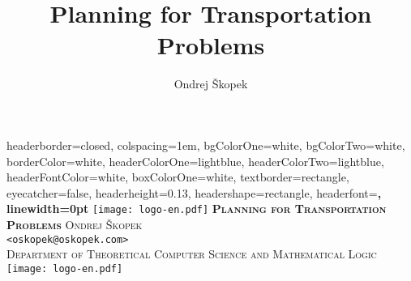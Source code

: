 \documentclass[a0paper,fontscale=0.285]{baposter} %
\title{\huge Planning for Transportation Problems} %
\author{Ondrej \v{S}kopek} %
\newcommand{\insertdepartment}{Department of Theoretical Computer Science and Mathematical Logic}
\begin{document}
\begin{poster}
{
headerborder=closed, %
colspacing=1em, %
bgColorOne=white, %
bgColorTwo=white, %
borderColor=white, %
headerColorOne=lightblue, %
headerColorTwo=lightblue, %
headerFontColor=white, %
boxColorOne=white, %
textborder=rectangle, %
eyecatcher=false, %
headerheight=0.13\textheight, %
headershape=rectangle, %
headerfont=\Large\bf\textsc, %
linewidth=0pt %
}
%
{\texttt{[image: logo-en.pdf]}} %
{\vspace{0.2em}\huge\bf\textsc{Planning for Transportation Problems}\vspace{0.3em}%
} %
{\Large\textsc{Ondrej {\v{S}}kopek}\\\vspace{0.1em}%
\large\texttt{<oskopek@oskopek.com>}\\\vspace{0.3em}%
\large\textsc{\insertdepartment{}}} %
{\texttt{[image: logo-en.pdf]}} %


\end{poster}
\end{document}
